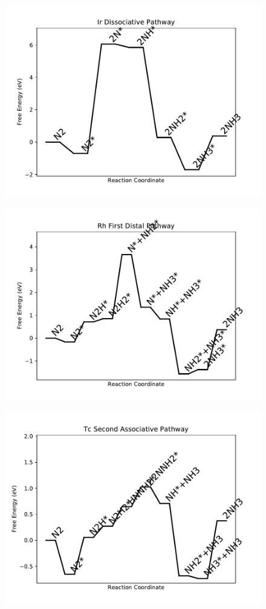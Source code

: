 \begin{figure}
\centering
\includegraphics[width=0.8\linewidth]{data/plots/Ir_dissociative.pdf}
\end{figure}

\begin{figure}
\centering
\includegraphics[width=0.8\linewidth]{data/plots/Rh_distal_1.pdf}
\end{figure}

\begin{figure}
\centering
\includegraphics[width=0.8\linewidth]{data/plots/Tc_associative_2.pdf}
\end{figure}

